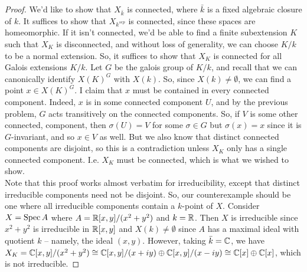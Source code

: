 \begin{proof}
	We'd like to show that $X_{\bar{k}}$ is connected, where $\bar{k}$ is a fixed algebraic closure of $k$. It suffices to show that $X_{k^{sep}}$ is connected, since these spaces are homeomorphic. If it isn't connected, we'd be able to find a finite subextension $K$ such that $X_K$ is disconnected, and without loss of generality, we can choose $K/k$ to be a normal extension. So, it suffices to show that $X_K$ is connected for all Galois extensions $K/k$. Let $G$ be the galois group of $K/k$, and recall that we can canonically identify $X(K)^G$ with $X(k)$. So, since $X(k) \neq \emptyset$, we can find a point $x \in X(K)^G$. I claim that $x$ must be contained in every connected component. Indeed, $x$ is in some connected component $U$, and by the previous problem, $G$ acts transitively on the connected components. So, if $V$ is some other connected, component, then $\sigma(U) = V$ for some $\sigma \in G$ but $\sigma(x) = x$ since it is $G$-invariant, and so $x \in V$ as well. But we also know that distinct connected components are disjoint, so this is a contradiction unless $X_K$ only has a single connected component. I.e. $X_K$ must be connected, which is what we wished to show. \\
	
	Note that this proof works almost verbatim for irreducibility, except that distinct irreducible components need not be disjoint. So, our counterexample should be one where all irreducible components contain a $k$-point of $X$. Consider $X = \operatorname{Spec} A$ where $A = \mathbb{R}[x,y]/(x^2+y^2)$ and $k = \mathbb{R}$. Then $X$ is irreducible since $x^2+y^2$ is irreducible in $\mathbb{R}[x,y]$ and $X(k) \neq \emptyset$ since $A$ has a maximal ideal with quotient $k$ -- namely, the ideal $(x,y)$. However, taking $\bar{k} = \mathbb{C}$, we have $X_K = \mathbb{C}[x,y]/(x^2+y^2) \cong \mathbb{C}[x,y]/(x+iy) \oplus \mathbb{C}[x,y]/(x-iy) \cong \mathbb{C}[x] \oplus \mathbb{C}[x]$, which is not irreducible.
\end{proof}
